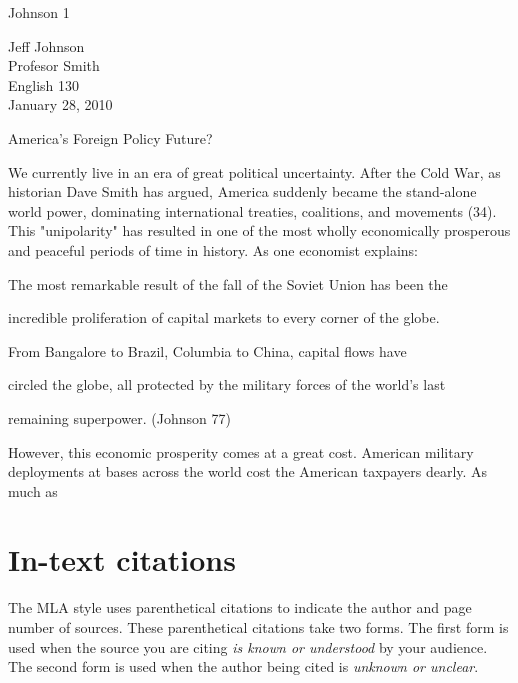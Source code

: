 \newpage

\thispagestyle{empty}
\begin{flushright}Johnson 1\end{flushright}
\bigskip
\begin{Spacing}{2}
Jeff Johnson\\
Profesor Smith\\
English 130\\
January 28, 2010
\end{Spacing}
\begin{center}
America's Foreign Policy Future?
\end{center}
\begin{Spacing}{2}

\hspace{.4in}We currently live in an era of great political uncertainty. After the Cold War, as 
historian Dave Smith has argued, America suddenly became the stand-alone world power, 
dominating international treaties, coalitions, and movements (34). This "unipolarity" has resulted in one of the 
most wholly economically prosperous and peaceful periods of time in history. As one 
economist explains:

\hspace{.8in}The most remarkable result of the fall of the Soviet Union has been the

\hspace{.8in}incredible proliferation of capital markets to every corner of the globe.

\hspace{.8in}From Bangalore to Brazil, Columbia to China, capital flows have  

\hspace{.8in}circled the globe, all protected by the military forces of the world's last 

\hspace{.8in}remaining superpower. (Johnson 77)

However, this economic prosperity comes at a great cost. American military 
deployments at bases across the world cost the American taxpayers dearly. As much as


\end{Spacing}
\newpage

\section{In-text citations}
The MLA style uses parenthetical citations to indicate the author and page number of 
sources. These parenthetical citations take two forms. The first form is used when the 
source you are citing \emph{is known or understood} by your audience. The second 
form is used when the author being cited is \emph{unknown or unclear}. 

